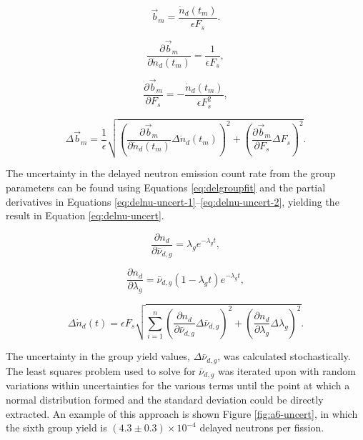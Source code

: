\documentclass{style/nseJournal}
\begin{document}
\begin{equation}
\vec{b}_m = \frac{\dot{n}_d(t_m)}{\epsilon F_s} .
\label{eq:ORIb-uncert-1}
\end{equation}

\begin{equation}
\frac{\partial \vec{b}_m}{\partial \dot{n}_d(t_m)} = \frac{1}{\epsilon F_s} ,
\label{eq:ORIb-uncert-2}
\end{equation}

\begin{equation}
\frac{\partial \vec{b}_m}{\partial F_s} = - \frac{\dot{n}_d(t_m)}{\epsilon F_s^2} ,
\label{eq:ORIb-uncert-3}
\end{equation}

\begin{equation}
\Delta \vec{b}_m = \frac{1}{\epsilon} \sqrt{ \left( \frac{\partial \vec{b}_m}{\partial \dot{n}_d(t_m)} \Delta \dot{n}_d(t_m) \right)^2 + \left( \frac{\partial \vec{b}_m}{\partial F_s} \Delta F_s \right)^2 } .
\label{eq:ORIb-uncert-4}
\end{equation}

The uncertainty in the delayed neutron emission count rate from the group parameters can be found using Equations \eqref{eq:delgroupfit} and the partial derivatives in Equations \eqref{eq:delnu-uncert-1}--\eqref{eq:delnu-uncert-2}, yielding the result in Equation \eqref{eq:delnu-uncert}.

\begin{equation}
\frac{\partial n_d}{\partial\bar{\nu}_{d, g}} = \lambda_g e^{-\lambda_g t} ,
\label{eq:delnu-uncert-1}
\end{equation}

\begin{equation}
\frac{\partial n_d}{\partial \lambda_g} = \bar{\nu}_{d, g} (1-\lambda_g t) e^{-\lambda_g t} ,
\label{eq:delnu-uncert-2}
\end{equation}

\begin{equation}
\Delta \dot{n}_d(t) = \epsilon F_s \sqrt{ \sum_{i=1}^n \left( \frac{\partial n_d}{\partial\bar{\nu}_{d, g}} \Delta\bar{\nu}_{d, g} \right)^2 + \left( \frac{\partial n_d}{\partial \lambda_g} \Delta \lambda_g \right)^2 }
\label{eq:delnu-uncert}.
\end{equation}


The uncertainty in the group yield values, $\Delta\bar{\nu}_{d, g}$, was calculated stochastically. The least squares problem used to solve for $\bar{\nu}_{d, g}$ was iterated upon with random variations within uncertainties for the various terms until the point at which a normal distribution formed and the standard deviation could be directly extracted.
An example of this approach is shown Figure \ref{fig:a6-uncert}, in which the sixth group yield is $(4.3 \pm 0.3) \times 10^{-4}$ delayed neutrons per fission.
\end{document}
